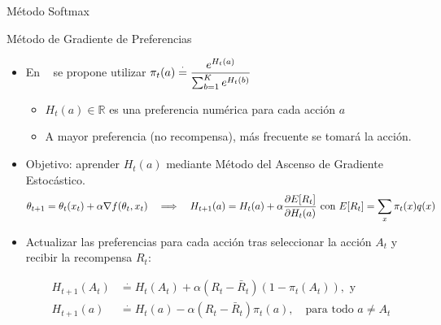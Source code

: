 \documentclass[10pt, envcountsect, handout, aspectratio=1610, hyperref={hypertexnames=true}]{beamer}
\begin{document}
\begin{frame}{Método Softmax}
\begin{minipage}{.8\textwidth}
\begin{algoritmo}[H]
\end{algoritmo}
\end{minipage}

\end{frame}




\begin{frame}{Método de Gradiente de Preferencias}

\begin{itemize}
\item En \cite{Sutton2018}  se propone utilizar
\( \displaystyle
\pi_t(a) \stackrel{\cdot}{=} \frac{e^{H_t(a)}}{\sum_{b=1}^{K} e^{H_t(b)}}
\)
\begin{itemize}
\item \( H_t(a) \in \mathbb{R} \) es una preferencia numérica para cada acción \( a \)
\item A mayor preferencia (no recompensa), más frecuente se tomará la acción.
\end{itemize}

\item Objetivo: aprender $H_t(a)$ mediante Método del Ascenso de Gradiente Estocástico.
$$\theta_{t+1} = \theta_t(x_t) + \alpha \nabla f(\theta_t, x_t) \quad 
\Longrightarrow  \quad
H_{t+1}(a) = H_t(a) + \alpha \frac{\partial E[R_t]}{\partial H_t(a)} \text{ con  }  E[R_t] = \displaystyle \sum_{x} \pi_t(x) q(x) 
$$

\item Actualizar las preferencias para cada acción tras  seleccionar la acción \( A_t \) y recibir la recompensa \( R_t \):

\begin{align*}
H_{t+1}(A_t) & \stackrel{\cdot}{=} H_t(A_t) + \alpha (R_t - \bar{R}_t)(1 - \pi_t(A_t)), \text{ y}  \\
H_{t+1}(a) & \stackrel{\cdot}{=} H_t(a) - \alpha (R_t - \bar{R}_t)\pi_t(a), \quad \text{para todo } a \neq A_t
\end{align*}



\end{itemize}

\end{frame}




\end{document}
